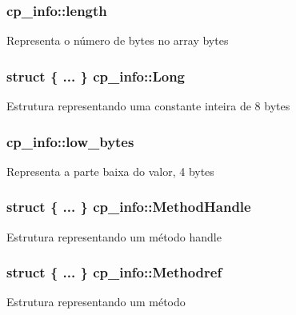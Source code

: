 \subsubsection[{\texorpdfstring{length}{length}}]{ cp\+\_\+info\+::length}\hypertarget{structcp__info_a1df458be110c843ea49b8a8a4c9dfb91}{}\label{structcp__info_a1df458be110c843ea49b8a8a4c9dfb91}
Representa o número de bytes no array bytes 
\subsubsection[{\texorpdfstring{Long}{Long}}]{\setlength{\rightskip}{0pt plus 5cm}struct \{ ... \}   cp\+\_\+info\+::\+Long}\hypertarget{structcp__info_a0275ac98f14502226fcc7be5f3b618ed}{}\label{structcp__info_a0275ac98f14502226fcc7be5f3b618ed}
Estrutura representando uma constante inteira de 8 bytes 
\subsubsection[{\texorpdfstring{low\+\_\+bytes}{low_bytes}}]{ cp\+\_\+info\+::low\+\_\+bytes}\hypertarget{structcp__info_aff872b9dcff18e083ca9f73ef82ab14f}{}\label{structcp__info_aff872b9dcff18e083ca9f73ef82ab14f}
Representa a parte baixa do valor, 4 bytes 
\subsubsection[{\texorpdfstring{Method\+Handle}{MethodHandle}}]{\setlength{\rightskip}{0pt plus 5cm}struct \{ ... \}   cp\+\_\+info\+::\+Method\+Handle}\hypertarget{structcp__info_aa2e7ee141904f8a1478412f2c216bcd8}{}\label{structcp__info_aa2e7ee141904f8a1478412f2c216bcd8}
Estrutura representando um método handle 
\subsubsection[{\texorpdfstring{Methodref}{Methodref}}]{\setlength{\rightskip}{0pt plus 5cm}struct \{ ... \}   cp\+\_\+info\+::\+Methodref}\hypertarget{structcp__info_a4afc97985c76278f209a037ed49247cd}{}\label{structcp__info_a4afc97985c76278f209a037ed49247cd}
Estrutura representando um método 
